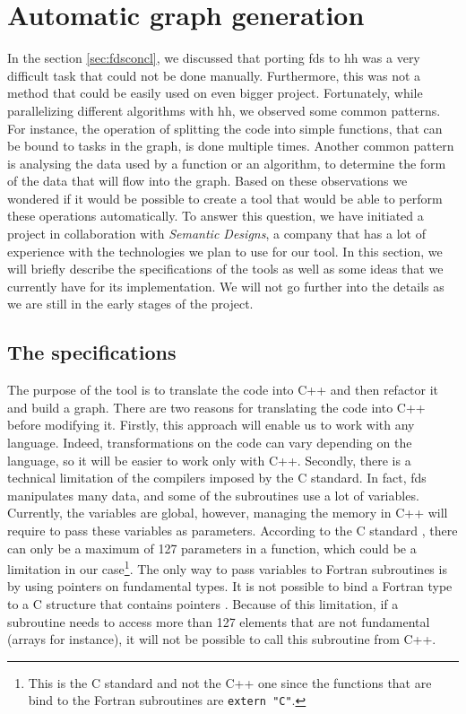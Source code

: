 
\clearpage{}
\section{Automatic graph generation}

In the section \ref{sec:fdsconcl}, we discussed that porting \gls{fds} to
\gls{hh} was a very difficult task that could not be done manually. Furthermore,
this was not a method that could be easily used on even bigger project.
Fortunately, while parallelizing different algorithms with \gls{hh}, we observed
some common patterns. For instance, the operation of splitting the code into
simple functions, that can be bound to tasks in the graph, is done multiple
times. Another common pattern is analysing the data used by a function or an
algorithm, to determine the form of the data that will flow into the graph.
Based on these observations we wondered if it would be possible to create a tool
that would be able to perform these operations automatically. To answer this
question, we have initiated a project in collaboration with \textit{Semantic
Designs}, a company that has a lot of experience with the technologies we plan
to use for our tool. In this section, we will briefly describe the
specifications of the tools as well as some ideas that we currently have for its
implementation. We will not go further into the details as we are still in the
early stages of the project.

\subsection{The specifications}

The purpose of the tool is to translate the code into C++ and then refactor it
and build a graph. There are two reasons for translating the code into C++
before modifying it. Firstly, this approach will enable us to work with any
language. Indeed, transformations on the code can vary depending on the
language, so it will be easier to work only with C++. Secondly, there is a
technical limitation of the compilers imposed by the C standard. In fact,
\gls{fds} manipulates many data, and some of the subroutines use a lot of
variables. Currently, the variables are global, however, managing the memory in
C++ will require to pass these variables as parameters. According to the C
standard \cite{cstd}, there can only be a maximum of 127 parameters in a
function, which could be a limitation in our case\footnote{This is the C
standard and not the C++ one since the functions that are bind to the Fortran
subroutines are \texttt{extern "C"}.}. The only way to pass variables to Fortran
subroutines is by using pointers on fundamental types. It is not possible to
bind a Fortran type to a C structure that contains pointers
\cite{fortranbindstruct}. Because of this limitation, if a subroutine needs to
access more than 127 elements that are not fundamental (arrays for instance), it
will not be possible to call this subroutine from C++.

